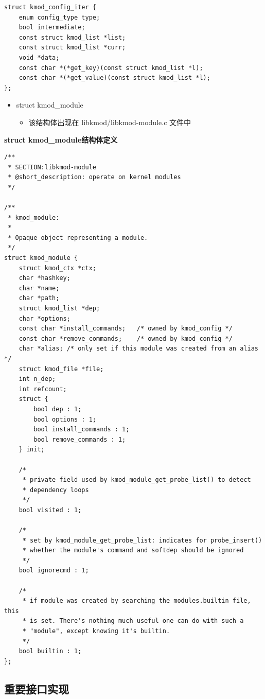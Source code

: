 {\begin{shaded}\begin{verbatim}
struct kmod_config_iter {
    enum config_type type;
    bool intermediate;
    const struct kmod_list *list;
    const struct kmod_list *curr;
    void *data;
    const char *(*get_key)(const struct kmod_list *l); 
    const char *(*get_value)(const struct kmod_list *l); 
};
\end{verbatim}\end{shaded}}
\begin{itemize}
\item
  struct kmod\_module
  \begin{itemize}
  \item
    该结构体出现在 libkmod/libkmod-module.c 文件中
  \end{itemize}
\end{itemize}
\textbf{struct kmod\_module结构体定义}

{\begin{shaded}\begin{verbatim}
/**
 * SECTION:libkmod-module
 * @short_description: operate on kernel modules
 */

/**
 * kmod_module:
 *
 * Opaque object representing a module.
 */
struct kmod_module {
    struct kmod_ctx *ctx;
    char *hashkey;
    char *name;
    char *path;
    struct kmod_list *dep;
    char *options;
    const char *install_commands;   /* owned by kmod_config */
    const char *remove_commands;    /* owned by kmod_config */
    char *alias; /* only set if this module was created from an alias */
    struct kmod_file *file;
    int n_dep;
    int refcount;
    struct {
        bool dep : 1;
        bool options : 1;
        bool install_commands : 1;
        bool remove_commands : 1;
    } init;

    /*
     * private field used by kmod_module_get_probe_list() to detect
     * dependency loops
     */
    bool visited : 1;

    /*
     * set by kmod_module_get_probe_list: indicates for probe_insert()
     * whether the module's command and softdep should be ignored
     */
    bool ignorecmd : 1;

    /*
     * if module was created by searching the modules.builtin file, this
     * is set. There's nothing much useful one can do with such a
     * "module", except knowing it's builtin.
     */
    bool builtin : 1;
};
\end{verbatim}\end{shaded}}
\subsection{重要接口实现}

